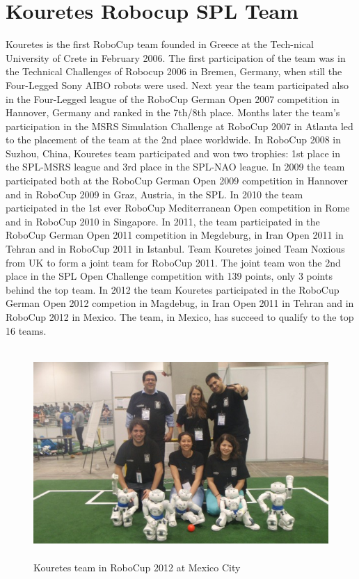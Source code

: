 \section{Kouretes Robocup SPL Team}
Kouretes is the first RoboCup team founded in Greece at the Tech-nical University of Crete in February 2006. The first participation of the team was in the Technical Challenges of Robocup 2006 in Bremen, Germany, when still the Four-Legged Sony AIBO robots were used. Next year the team participated also in the Four-Legged league of the RoboCup German Open 2007 competition in Hannover, Germany and ranked in the 7th/8th place. Months later the team's participation in the MSRS Simulation Challenge at RoboCup 2007 in Atlanta led to the placement of the team at the 2nd place worldwide. In RoboCup 2008 in Suzhou, China, Kouretes team participated and won two trophies: 1st place in the SPL-MSRS league and 3rd place in the SPL-NAO league. In 2009 the team participated both at the RoboCup German Open 2009 competition in Hannover and in RoboCup 2009 in Graz, Austria, in the SPL. In 2010 the team participated in the 1st ever RoboCup Mediterranean Open competition in Rome and in RoboCup 2010 in Singapore. In 2011, the team participated in the RoboCup German Open 2011 competition in Megdeburg, in Iran Open 2011 in Tehran and in RoboCup 2011 in Istanbul. Team Kouretes joined Team Noxious from UK to form a joint team for RoboCup 2011. The joint team won the 2nd place in the SPL Open Challenge competition with 139 points, only 3 points behind the top team. In 2012 the team Kouretes participated in the RoboCup German Open 2012 competion in Magdebug, in Iran Open 2011 in Tehran and in RoboCup 2012 in Mexico. The team, in Mexico, has succeed to qualify to the top 16 teams.
\begin{figure}[h]
	\begin{center}
		\includegraphics[height = 8cm]{Figures/robocup2012-team.jpg}
 		\caption{Kouretes team in RoboCup 2012 at Mexico City}
 		\label{fig:RoboCup2012}
	\end{center}
\end{figure}

